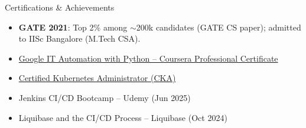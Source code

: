 \documentclass{resume} %
\begin{document}





\begin{rSection}{Certifications \& Achievements} 
\begin{itemize}
    \item \textbf{GATE 2021}: Top 2\% among $\sim$200k candidates (GATE CS paper); admitted to IISc Bangalore (M.Tech CSA).
    \item \href{https://www.credly.com/badges/75d9811c-198b-4dc5-a41d-dd3a6e6d9ee3/public_url}{Google IT Automation with Python – Coursera Professional Certificate}
    \item \href{https://www.credly.com/badges/5e298069-3cc7-4a4b-b30c-79a8ae8f624f/public_url}{Certified Kubernetes Administrator (CKA)}
    \item Jenkins CI/CD Bootcamp -- Udemy (Jun 2025)
    \item Liquibase and the CI/CD Process -- Liquibase (Oct 2024)
\end{itemize}

\end{rSection}
\end{document}
